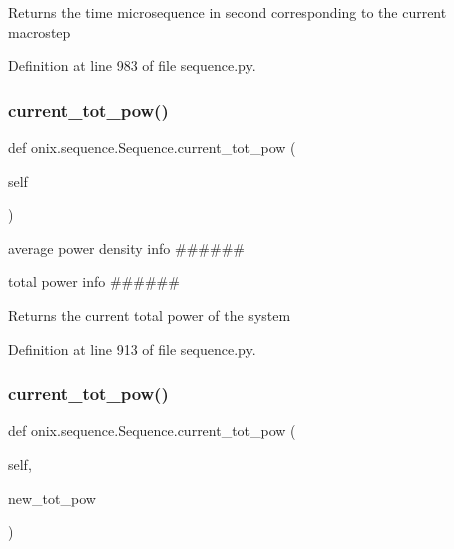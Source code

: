 \begin{DoxyVerb}Returns the time microsequence in second corresponding to the current macrostep
\end{DoxyVerb}
 

Definition at line 983 of file sequence.\+py.

\mbox{\label{classonix_1_1sequence_1_1Sequence_a8ad2f8fc75d5951798c64bfd8924b7c0}} 
\subsubsection{\texorpdfstring{current\+\_\+tot\+\_\+pow()}{current\_tot\_pow()}\hspace{0.1cm}{\footnotesize\ttfamily [1/2]}}
{\footnotesize\ttfamily def onix.\+sequence.\+Sequence.\+current\+\_\+tot\+\_\+pow (\begin{DoxyParamCaption}\item[{}]{self }\end{DoxyParamCaption})}



average power density info \#\#\#\#\#\# 

total power info \#\#\#\#\#\# \begin{DoxyVerb}Returns the current total power of the system
\end{DoxyVerb}
 

Definition at line 913 of file sequence.\+py.

\mbox{\label{classonix_1_1sequence_1_1Sequence_a1a280133e5dae74875a5d1e80f923c10}} 
\subsubsection{\texorpdfstring{current\+\_\+tot\+\_\+pow()}{current\_tot\_pow()}\hspace{0.1cm}{\footnotesize\ttfamily [2/2]}}
{\footnotesize\ttfamily def onix.\+sequence.\+Sequence.\+current\+\_\+tot\+\_\+pow (\begin{DoxyParamCaption}\item[{}]{self,  }\item[{}]{new\+\_\+tot\+\_\+pow }\end{DoxyParamCaption})}

